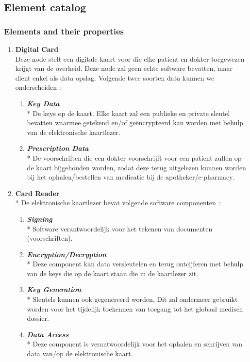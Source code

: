\documentclass[a4paper,10pt]{article}
\begin{document}
\subsection{Element catalog}

\subsubsection{Elements and their properties}

\begin{enumerate}
 \item \textbf{Digital Card}\\
Deze node stelt een digitale kaart voor die elke patient en dokter toegewezen krijgt van de overheid. Deze node zal geen echte software bevatten, maar dient enkel als data opslag. Volgende twee soorten data kunnen we onderscheiden :
\begin{enumerate}
 \item \textit{\textbf{Key Data}}\\*
De keys op de kaart. Elke kaart zal een publieke en private sleutel bevatten waarmee getekend en/of geëncrypteerd kan worden met behulp van de elektronische kaartlezer.
\item \textit{\textbf{Prescription Data}}\\*
De voorschriften die een dokter voorschrijft voor een patient zullen op de kaart bijgehouden worden, zodat deze terug uitgelezen kunnen worden bij het ophalen/bestellen van medicatie bij de apotheker/e-pharmacy.
\end{enumerate}

\item \textbf{Card Reader}\\*
De elektronische kaartlezer bevat volgende software componenten : 
\begin{enumerate}
\item \textit{\textbf{Signing}}\\*
Software verantwoordelijk voor het tekenen van documenten (voorschriften).
\item \textit{\textbf{Encryption/Decryption}}\\*
Deze component kan data versleutelen en terug ontcijferen met behulp van de keys die op de kaart staan die in de kaartlezer zit.
\item \textit{\textbf{Key Generation}}\\*
Sleutels kunnen ook gegenereerd worden. Dit zal ondermeer gebruikt worden voor het tijdelijk toekennen van toegang tot het globaal medisch dossier.
\item \textit{\textbf{Data Access}}\\*
Deze component is verantwoordelijk voor het ophalen en schrijven van data van/op de elektronische kaart.
\end{enumerate}


\end{enumerate}
\end{document}
